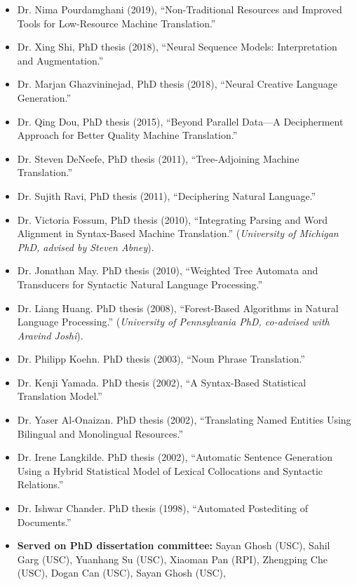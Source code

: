 \begin{itemize}
\item Dr. Nima Pourdamghani (2019),
``Non-Traditional Resources and Improved Tools for Low-Resource
Machine Translation.''
\item Dr. Xing Shi, PhD thesis (2018),
``Neural Sequence Models: Interpretation and Augmentation.''
\item Dr. Marjan Ghazvininejad, PhD thesis (2018),
``Neural Creative Language Generation.''
\item Dr. Qing Dou, PhD thesis (2015),
``Beyond Parallel Data---A Decipherment Approach for Better Quality
Machine Translation.''
\item Dr. Steven DeNeefe, PhD thesis (2011),
``Tree-Adjoining Machine Translation.''
\item Dr. Sujith Ravi, PhD thesis (2011),
``Deciphering Natural Language.''
\item Dr. Victoria Fossum, PhD thesis (2010),
``Integrating Parsing and Word Alignment in Syntax-Based Machine Translation.''
({\em University of Michigan PhD, advised by Steven Abney}).
\item Dr. Jonathan May.  PhD thesis (2010),
``Weighted Tree Automata and Transducers for
Syntactic Natural Language Processing.''
\item Dr. Liang Huang.  PhD thesis (2008),
``Forest-Based Algorithms in Natural Language Processing.''
({\em University of Pennsylvania PhD, co-advised with Aravind Joshi}).
\item Dr. Philipp Koehn.  PhD thesis (2003),
``Noun Phrase Translation.''  
\item Dr. Kenji Yamada. PhD thesis (2002),
``A Syntax-Based Statistical Translation Model.''
\item Dr. Yaser Al-Onaizan. PhD thesis (2002),
``Translating Named Entities Using Bilingual and 
Monolingual Resources.''
\item Dr. Irene Langkilde. PhD thesis (2002),
``Automatic Sentence Generation Using a Hybrid Statistical Model of 
Lexical Collocations and Syntactic Relations.''
\item Dr. Ishwar Chander. PhD thesis (1998), 
``Automated Postediting of Documents.''
\item {\bf Served on PhD dissertation committee:}
Sayan Ghosh (USC),
Sahil Garg (USC),
Yuanhang Su (USC),
Xiaoman Pan (RPI),
Zhengping Che (USC),
Dogan Can (USC),
Sayan Ghosh (USC),

\end{itemize}
